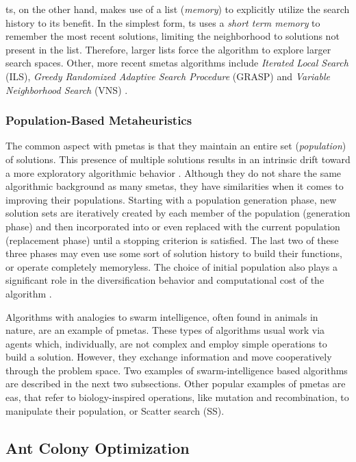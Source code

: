 \Gls{ts}, on the other hand, makes use of a list (\textit{memory}) to explicitly utilize the search history to its benefit. In the simplest form, \gls{ts} uses a \textit{short term memory} to remember the most recent solutions, limiting the neighborhood to solutions not present in the list. Therefore, larger lists force the algorithm to explore larger search spaces.
Other, more recent \glspl{smeta} algorithms include \textit{Iterated Local Search} (ILS), \textit{Greedy Randomized Adaptive Search Procedure} (GRASP) and \textit{Variable Neighborhood Search} (VNS) \cite{talbi2009metaheuristics}.

\subsubsection{Population-Based Metaheuristics}

The common aspect with \glspl{pmeta} is that they maintain an entire set (\textit{population}) of solutions. This presence of multiple solutions results in an intrinsic drift toward a more exploratory algorithmic behavior \cite{blum2003metaheuristics}. 
Although they do not share the same algorithmic background as many \glspl{smeta}, they have similarities when it comes to improving their populations. Starting with a population generation phase, new solution sets are iteratively created by each member of the population (generation phase) and then incorporated into or even replaced with the current population (replacement phase) until a stopping criterion is satisfied. The last two of these three phases may even use some sort of solution history to build their functions, or operate completely memoryless. The choice of initial population also plays a significant role in the diversification behavior and computational cost of the algorithm  \cite{talbi2009metaheuristics}. 

Algorithms with analogies to swarm intelligence, often found in animals in nature, are an example of \glspl{pmeta}. These types of algorithms usual work via agents which, individually, are not complex and employ simple operations to build a solution. However, they exchange information and move cooperatively through the problem space. Two examples of swarm-intelligence based algorithms are described in the next two subsections. Other popular examples of \glspl{pmeta} are \glspl{ea}, that refer to biology-inspired operations, like mutation and recombination, to manipulate their population, or Scatter search (SS).


\subsection{Ant Colony Optimization}
\label{chap:aco}

